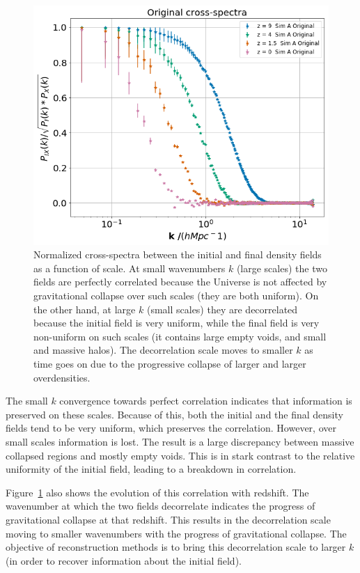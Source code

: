 \begin{figure}
    \centering
    \includegraphics[width=1\columnwidth]{images/perfRecon/orig.png}%
    
    \caption{
    Normalized cross-spectra between the initial and final density fields as a function of scale. At small wavenumbers $k$ (large scales) the two fields are perfectly correlated because the Universe is not affected by gravitational collapse over such scales (they are both uniform). On the other hand, at large $k$ (small scales) they are decorrelated because the initial field is very uniform, while the final field is very non-uniform on such scales (it contains large empty voids, and small and massive halos). The decorrelation scale moves to smaller $k$ as time goes on due to the progressive collapse of larger and larger overdensities.
    }
    
    \label{fig:3.1}
\end{figure}

The small $k$ convergence towards perfect correlation indicates that information is preserved on these scales. Because of this, both the initial and the final density fields tend to be very uniform, which preserves the correlation. However, over small scales information is lost. The result is a large discrepancy between massive collapsed regions and mostly empty voids. This is in stark contrast to the relative uniformity of the initial field, leading to a breakdown in correlation.

Figure~\ref{fig:3.1} also shows the evolution of this correlation with redshift. The wavenumber at which the two fields decorrelate indicates the progress of gravitational collapse at that redshift. This results in the decorrelation scale moving to smaller wavenumbers with the progress of gravitational collapse. The objective of reconstruction methods is to bring this decorrelation scale to larger $k$ (in order to recover information about the initial field).

